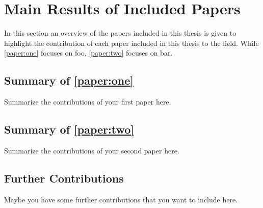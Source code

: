 \section{Main Results of Included Papers}
\label{sec:contributions}

In this section an overview of the papers included in this thesis is given to highlight the contribution of each paper included in this thesis to the field.
While \cref{paper:one} focuses on foo, \cref{paper:two} focuses on bar.

\subsection{Summary of \texorpdfstring{\cref{paper:one}}{Paper I}}
\epigraph{\paperOne}{}

\noindent
Summarize the contributions of your first paper here.


\subsection{Summary of \texorpdfstring{\cref{paper:two}}{Paper II}}
\epigraph{\paperTwo}{}

\noindent
Summarize the contributions of your second paper here.


\subsection{Further Contributions}
Maybe you have some further contributions that you want to include here.